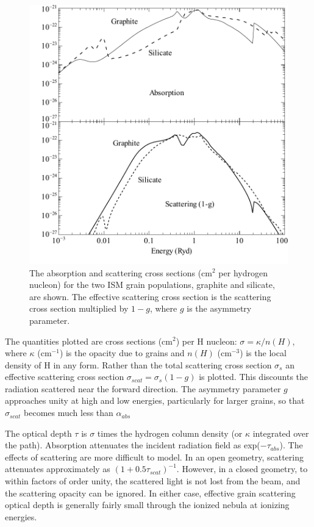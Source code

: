\begin{figure}
\centering
\label{fig:GrainOpacity}
\includegraphics{GrainOpacity}
\caption[Grain opacities]{The absorption and scattering cross sections (cm$^2$ per hydrogen
nucleon) for the two ISM grain populations, graphite and silicate, are shown.
The effective scattering cross section is the scattering cross section
multiplied by $1-g$, where $g$ is the asymmetry parameter.}
\end{figure}

The quantities plotted are cross sections (cm$^2$) per H nucleon:
$\sigma = \kappa/n(H)$,
where $\kappa$ (cm$^{-1}$) is the opacity due to grains and $n(H)$
(cm$^{-3}$) is the local
density of H in any form.  Rather than the total scattering cross section
$\sigma_s$ an effective scattering cross section $\sigma_{scat} = \sigma_s
(1-g)$ is plotted.  This
discounts the radiation scattered near the forward direction.  The asymmetry
parameter $g$ approaches unity at high and low energies, particularly for
larger grains, so that $\sigma_{scat}$ becomes much less than $\alpha_{abs}$

The optical depth $\tau$ is $\sigma$ times the hydrogen column density
(or $\kappa$ integrated
over the path).  Absorption attenuates the incident radiation field as
exp($-\tau_{abs}$).  The effects of scattering are more difficult to model.  In an
open geometry, scattering attenuates approximately as
$(1+0.5 \tau_{scat})^{-1}$.
However, in a closed geometry, to within factors of order unity, the
scattered light is not lost from the beam, and the scattering opacity can
be ignored.  In either case, effective grain scattering optical depth is
generally fairly small through the ionized nebula at ionizing energies.

